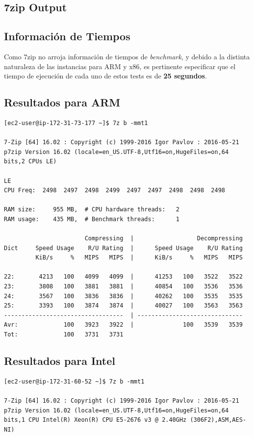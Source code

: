 \documentclass[a4paper,openright,12pt]{article}
\begin{document}
\begin{appendices}
\section{7zip Output}\label{anexo:7zip_output}
\subsection{Información de Tiempos}
Como 7zip no arroja información de tiempos de \emph{benchmark}, y debido a la distinta naturaleza de las instancias para ARM y x86, es pertinente especificar que el
tiempo de ejecución de cada uno de estos tests es de \textbf{25 segundos}.

\subsection{Resultados para ARM}
\begin{verbatim}
[ec2-user@ip-172-31-73-177 ~]$ 7z b -mmt1

7-Zip [64] 16.02 : Copyright (c) 1999-2016 Igor Pavlov : 2016-05-21
p7zip Version 16.02 (locale=en_US.UTF-8,Utf16=on,HugeFiles=on,64 bits,2 CPUs LE)

LE
CPU Freq:  2498  2497  2498  2499  2497  2497  2498  2498  2498

RAM size:     955 MB,  # CPU hardware threads:   2
RAM usage:    435 MB,  # Benchmark threads:      1

                       Compressing  |                  Decompressing
Dict     Speed Usage    R/U Rating  |      Speed Usage    R/U Rating
         KiB/s     %   MIPS   MIPS  |      KiB/s     %   MIPS   MIPS

22:       4213   100   4099   4099  |      41253   100   3522   3522
23:       3808   100   3881   3881  |      40854   100   3536   3536
24:       3567   100   3836   3836  |      40262   100   3535   3535
25:       3393   100   3874   3874  |      40027   100   3563   3563
----------------------------------  | ------------------------------
Avr:             100   3923   3922  |              100   3539   3539
Tot:             100   3731   3731
\end{verbatim}
\newpage
\subsection{Resultados para Intel}
\begin{verbatim}
[ec2-user@ip-172-31-60-52 ~]$ 7z b -mmt1

7-Zip [64] 16.02 : Copyright (c) 1999-2016 Igor Pavlov : 2016-05-21
p7zip Version 16.02 (locale=en_US.UTF-8,Utf16=on,HugeFiles=on,64 bits,1 CPU Intel(R) Xeon(R) CPU E5-2676 v3 @ 2.40GHz (306F2),ASM,AES-NI)


\end{verbatim}
\end{appendices}
\end{document}
